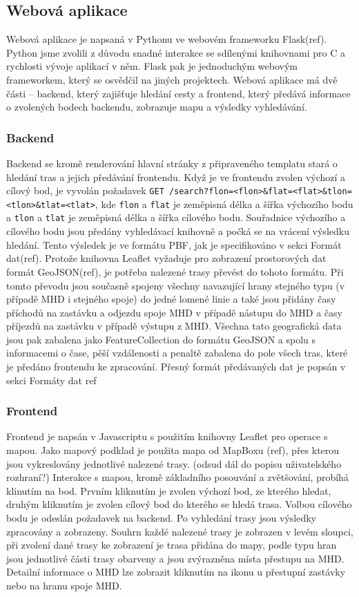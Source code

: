 \subsection{Webová aplikace}
Webová aplikace je napsaná v Pythonu ve webovém frameworku Flask(\TODO ref).
Python jsme zvolili z důvodu snadné interakce se sdílenými knihovnami pro C a
rychlosti vývoje aplikací v něm. Flask pak je jednoduchým webovým frameworkem,
který se osvědčil na jiných projektech. Webová aplikace má dvě části -- backend,
který zajišťuje hledání cesty a frontend, který předává informace o zvolených
bodech backendu, zobrazuje mapu a výsledky vyhledávání. 

\subsubsection{Backend}
Backend se kromě renderování hlavní stránky z připraveného templatu stará o
hledání tras a jejich předávání frontendu. Když je ve frontendu zvolen výchozí a
cílový bod, je vyvolán požadavek {\tt GET
/search?flon=<flon>\&flat=<flat>\&tlon=<tlon>\&tlat=<tlat>}, kde {\tt flon} a
{\tt flat} je zeměpisná délka a šířka výchozího bodu a {\tt tlon} a {\tt tlat}
je zeměpisná délka a šířka cílového bodu. Souřadnice výchozího a cílového bodu
jsou předány vyhledávací knihovně a počká se na vrácení výsledku hledání. Tento
výsledek je ve formátu PBF, jak je specifikováno v sekci Formát dat(\TODO ref).
Protože knihovna Leaflet vyžaduje pro zobrazení prostorových dat formát
GeoJSON(\TODO ref), je potřeba nalezené trasy převést do tohoto formátu. Při
tomto převodu jsou současně spojeny všechny navazující hrany stejného typu (v
případě MHD i stejného spoje) do jedné lomené linie a také jsou přidány časy
příchodů na zastávku a odjezdu spoje MHD v případě nástupu do MHD a časy
příjezdů na zastávku v případě výstupu z MHD. Všechna tato geografická data jsou
pak zabalena jako FeatureCollection do formátu GeoJSON a spolu s informacemi o
čase, pěší vzdálenosti a penaltě zabalena do pole všech tras, které je předáno
frontendu ke zpracování. Přesný formát předávaných dat je popsán v sekci Formáty
dat {\TODO ref} 
\subsubsection{Frontend}
Frontend je napsán v Javascriptu s použitím knihovny Leaflet pro operace s
mapou. Jako mapový podklad je použita mapa od MapBoxu (\TODO ref), přes kterou
jsou vykreslovány jednotlivé nalezené trasy. (\TODO odsud dál do popisu
uživatelského rozhraní?) Interakce s mapou, kromě základního
posouvání a zvětšování, probíhá klinutím na bod. Prvním kliknutím je zvolen
výchozí bod, ze kterého hledat, druhým kliknutím je zvolen cílový bod do kterého
se hledá trasa. Volbou cílového bodu je odeslán požadavek na backend. Po
vyhledání trasy jsou výsledky zpracovány a zobrazeny. Souhrn každé nalezené
trasy je zobrazen v levém sloupci, při zvolení dané trasy ke zobrazení je trasa
přidána do mapy, podle typu hran jsou jednotlivé části trasy obarveny a jsou
zvýrazněna místa přestupu na MHD. Detailní informace o MHD lze zobrazit
kliknutím na ikonu u přestupní zastávky nebo na hranu spoje MHD.
